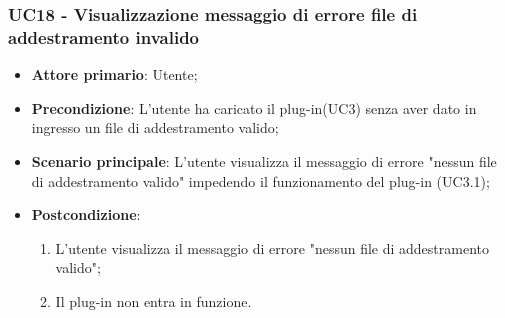 \subsubsection{UC18 - Visualizzazione messaggio di errore file di addestramento invalido}
\label{sssec:uc18}
\begin{itemize}
  \item \textbf{Attore primario}: Utente;
  \item \textbf{Precondizione}: L'utente ha caricato il plug-in(UC3) senza aver dato in ingresso un file di addestramento valido;
  \item \textbf{Scenario principale}: L'utente visualizza il messaggio di errore "nessun file di addestramento valido" impedendo il funzionamento del plug-in (UC3.1);
  \item \textbf{Postcondizione}:
  \begin{enumerate}
		\item L'utente visualizza il messaggio di errore "nessun file di addestramento valido";
		\item Il plug-in non entra in funzione.
	\end{enumerate}
\end{itemize}
